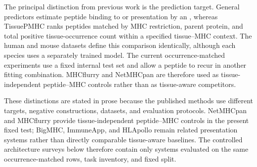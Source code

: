 The principal distinction from previous work is the prediction target. General predictors estimate peptide binding to or presentation by an \plainMHC{}, whereas TissuePMHC ranks peptides matched by MHC restriction, parent protein, and total positive tissue-occurrence count within a specified tissue--MHC context. The human and mouse datasets define this comparison identically, although each species uses a separately trained model. The current occurrence-matched experiments use a fixed internal test set and allow a peptide to recur in another fitting combination. MHCflurry and NetMHCpan are therefore used as tissue-independent peptide--MHC controls rather than as tissue-aware competitors.

These distinctions are stated in prose because the published methods use different targets, negative constructions, datasets, and evaluation protocols. NetMHCpan and MHCflurry provide tissue-independent peptide--MHC controls in the present fixed test; BigMHC, ImmuneApp, and HLApollo remain related presentation systems rather than directly comparable tissue-aware baselines. The controlled architecture surveys below therefore contain only systems evaluated on the same occurrence-matched rows, task inventory, and fixed split.
